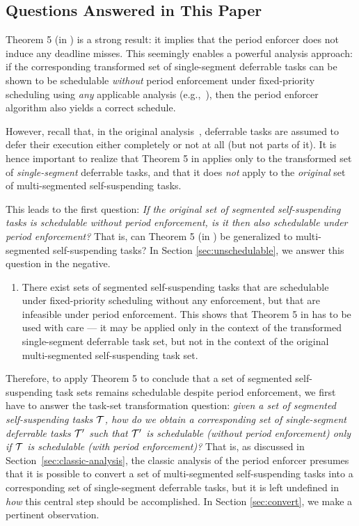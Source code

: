 \subsection{Questions Answered in This Paper}
\label{sec:questions}

Theorem 5 (in \cite{Raj:suspension1991}) is a strong result: it implies that the period enforcer does not induce any deadline misses. This seemingly enables a powerful analysis approach: if the corresponding transformed set of single-segment deferrable tasks can be shown to be schedulable  \emph{without} period enforcement under fixed-priority scheduling using \emph{any} applicable analysis (e.g.,~\cite{ABRTW:93}), then the period enforcer algorithm also yields a correct schedule. 

However, recall that, in the original analysis~\cite{Raj:suspension1991}, deferrable tasks are assumed to defer their  execution either completely or not at all (but not parts of it). It is hence important to realize that Theorem 5 in \cite{Raj:suspension1991} applies only to the transformed set of \emph{single-segment} deferrable tasks, and that it does \emph{not} apply to the \emph{original} set of multi-segmented self-suspending tasks. 

This leads to the first question: \emph{If the  original set of segmented self-suspending tasks is schedulable without period enforcement, is it then also schedulable under period enforcement?} That is, can Theorem 5 (in \cite{Raj:suspension1991}) be generalized to multi-segmented self-suspending tasks? In Section \ref{sec:unschedulable}, we answer this question in the negative.

\begin{enumerate}
	\item There exist sets of segmented self-suspending tasks that are schedulable under fixed-priority scheduling without any enforcement, but that are infeasible under period enforcement. This shows that Theorem 5 in \cite{Raj:suspension1991} has to be  used with care --- it may be applied only in the context of the transformed single-segment deferrable task set, but not in the context of the original multi-segmented self-suspending task set.
\end{enumerate}


Therefore, to apply Theorem 5 to conclude that a set of segmented self-suspending task sets remains schedulable despite period enforcement, we first have to answer the task-set transformation question: \emph{given a set of segmented self-suspending tasks $\mathcal{T}$, how do we obtain a corresponding set of single-segment deferrable tasks $\mathcal{T}'$ such that $\mathcal{T}'$ is schedulable (without period enforcement)  only if $\mathcal{T}$ is schedulable (with period enforcement)?} That is, as discussed in Section~\ref{sec:classic-analysis}, the classic analysis of the period enforcer \cite{Raj:suspension1991} presumes that it is possible to convert a set of multi-segmented self-suspending tasks into a corresponding set of single-segment deferrable tasks, but it is left undefined in~\cite{Raj:suspension1991}  \emph{how} this central step should be accomplished. In Section \ref{sec:convert}, we make a pertinent observation.

